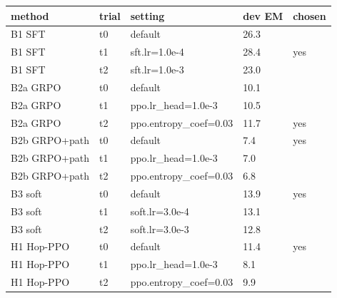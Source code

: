 \begin{tabular}{lllll}
\toprule
method & trial & setting & dev EM & chosen \\
\midrule
B1 SFT & t0 & default & 26.3 &  \\
B1 SFT & t1 & sft.lr=1.0e-4 & 28.4 & yes \\
B1 SFT & t2 & sft.lr=1.0e-3 & 23.0 &  \\
B2a GRPO & t0 & default & 10.1 &  \\
B2a GRPO & t1 & ppo.lr\_head=1.0e-3 & 10.5 &  \\
B2a GRPO & t2 & ppo.entropy\_coef=0.03 & 11.7 & yes \\
B2b GRPO+path & t0 & default & 7.4 & yes \\
B2b GRPO+path & t1 & ppo.lr\_head=1.0e-3 & 7.0 &  \\
B2b GRPO+path & t2 & ppo.entropy\_coef=0.03 & 6.8 &  \\
B3 soft & t0 & default & 13.9 & yes \\
B3 soft & t1 & soft.lr=3.0e-4 & 13.1 &  \\
B3 soft & t2 & soft.lr=3.0e-3 & 12.8 &  \\
H1 Hop-PPO & t0 & default & 11.4 & yes \\
H1 Hop-PPO & t1 & ppo.lr\_head=1.0e-3 & 8.1 &  \\
H1 Hop-PPO & t2 & ppo.entropy\_coef=0.03 & 9.9 &  \\
\bottomrule
\end{tabular}
